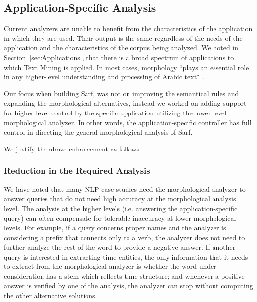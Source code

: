 \documentclass[a4,12pt]{report}
\begin{document}
\subsection{Application-Specific Analysis}

Current analyzers are unable to benefit from the characteristics of the application in which they are used.
Their output is the same regardless of the needs of the application and the characteristics of the corpus
being analyzed. We noted in Section~\ref{sec:Applications}, that
there is a broad spectrum of applications to which Text Mining is applied. In most cases, morphology 
``plays an essential role in any higher-level understanding and processing of Arabic text"~\cite{Sou07}.

Our focus when building Sarf, was not on improving the semantical rules and 
expanding the morphological alternatives, instead we worked on adding support 
for higher level control by the specific application utilizing the lower level 
morphological analyzer. In other words, the application-specific controller has 
full control in directing the general morphological analysis of Sarf. 

We justify the above enhancement as follows.

\subsubsection{Reduction in the Required Analysis}

We have noted that many NLP case studies need the 
morphological analyzer to answer queries that do not need 
high accuracy at the morphological analysis level.
The analysis at the higher levels 
(i.e. answering the application-specific query)
can often compensate for 
tolerable inaccuracy at lower morphological levels. 
For example, if a query concerns proper names and the 
analyzer is considering a 
prefix that connects only to a verb,
the analyzer does not need to further analyze the rest of the word 
to provide a negative answer.
If another query is interested in extracting time entities, the only 
information that it needs to extract from the morphological analyzer 
is whether the word under consideration has a stem which reflects 
time structure; and whenever a positive answer is verified by one of the analysis,
the analyzer can stop without computing the other alternative solutions.
\end{document}
